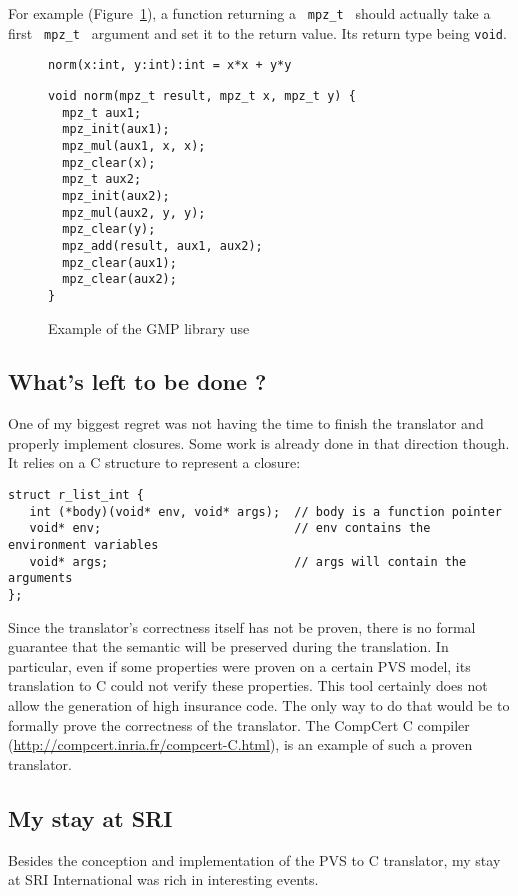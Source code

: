 \documentclass[12pt,a4paper]{article}
\newcommand{\cl}[1]{\texttt{#1}}
\newcommand{\mpzt}{ \texttt{ mpz\_t } }
\begin{document}
For example (Figure~\ref{fig:exGMP}), a function returning a \mpzt should actually take a first \mpzt argument and set it to the return value. Its return type being \cl{void}.

\begin{figure}[!ht]
\cl{norm(x:int, y:int):int = x*x + y*y}
\begin{lstlisting}
void norm(mpz_t result, mpz_t x, mpz_t y) {
  mpz_t aux1;
  mpz_init(aux1);
  mpz_mul(aux1, x, x);
  mpz_clear(x);
  mpz_t aux2;
  mpz_init(aux2);
  mpz_mul(aux2, y, y);
  mpz_clear(y);
  mpz_add(result, aux1, aux2);
  mpz_clear(aux1);
  mpz_clear(aux2);
}
\end{lstlisting}
\caption{Example of the GMP library use}
\label{fig:exGMP}
\end{figure}



\subsection{What's left to be done ?}

One of my biggest regret was not having the time to finish the translator and properly implement closures. Some work is already done in that direction though. It relies on a C structure to represent a closure:
\begin{lstlisting}
struct r_list_int {
   int (*body)(void* env, void* args);  // body is a function pointer
   void* env;                           // env contains the environment variables
   void* args;                          // args will contain the arguments
};
\end{lstlisting}


Since the translator's correctness itself has not be proven, there is no formal guarantee that the semantic will be preserved during the translation. In particular, even if some properties were proven on a certain PVS model, its translation to C could not verify these properties. This tool certainly does not allow the generation of high insurance code. The only way to do that would be to formally prove the correctness of the translator. The CompCert C compiler (\href{http://compcert.inria.fr}{http://compcert.inria.fr/compcert-C.html}), is an example of such a proven translator.


\subsection{My stay at SRI}

Besides the conception and implementation of the PVS to C translator, my stay at SRI International was rich in interesting events. 
\end{document}
